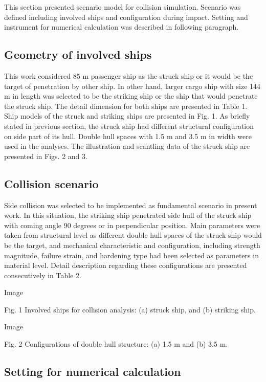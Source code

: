 \documentclass[../Final.tex]{subfiles}
\begin{document}
This section presented scenario model for collision simulation. 
Scenario was defined including involved ships and configuration during impact. Setting and instrument for numerical calculation was described in following paragraph. 

\subsection{Geometry of involved ships}

This work considered 85 m passenger ship as the struck ship or it would be the target of penetration by other ship. 
In other hand, larger cargo ship with size 144 m in length was selected to be the striking ship or the ship that would penetrate the struck ship. 
The detail dimension for both ships are presented in Table 1. Ship models of the struck and striking ships are presented in Fig. 1. 
As briefly stated in previous section, the struck ship had different structural configuration on side part of its hull. Double hull spaces with 1.5 m and 3.5 m in width were used in the analyses. 
The illustration and scantling data of the struck ship are presented in Figs. 2 and 3. 

\subsection{Collision scenario}

Side collision was selected to be implemented as fundamental scenario in present work. 
In this situation, the striking ship penetrated side hull of the struck ship with coming angle 90 degrees or in perpendicular position. 
Main parameters were taken from structural level as different double hull spaces of the struck ship would be the target, and mechanical character­istic and configuration, including strength magnitude, 
failure strain, and hardening type had been selected as parameters in material level. Detail description regarding these configurations are presented consecutively in Table 2. 

Image

Fig. 1 Involved ships for collision analysis: (a) struck ship, and (b) striking ship. 

Image

Fig. 2 Configurations of double hull structure: (a) 1.5 m and (b) 3.5 m. 

\subsection{Setting for numerical calculation}
\end{document}
